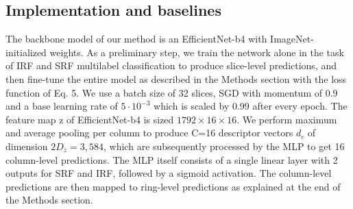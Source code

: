 \subsection{Implementation and baselines}
The backbone model of our method is an EfficientNet-b4 with ImageNet-initialized weights. As a preliminary step, we train the network alone in the task of IRF and SRF multilabel classification to produce slice-level predictions, and then fine-tune the entire model as described in the Methods section with the loss function of Eq. 5. We use a batch size of 32 slices, SGD with momentum of 0.9 and a base learning rate of $5\cdot10^{-3}$ which is scaled by $0.99$ after every epoch. The feature map z of EfficientNet-b4 is sized $1792\times 16\times 16$. We perform maximum and average pooling per column to produce C=16 descriptor vectors $d_c$ of dimension $2D_z=3,584$, which are subsequently processed by the MLP to get 16 column-level predictions. The MLP itself consists of a single linear layer with 2 outputs for SRF and IRF, followed by a sigmoid activation. The column-level predictions are then mapped to ring-level predictions as explained at the end of the Methods section.

